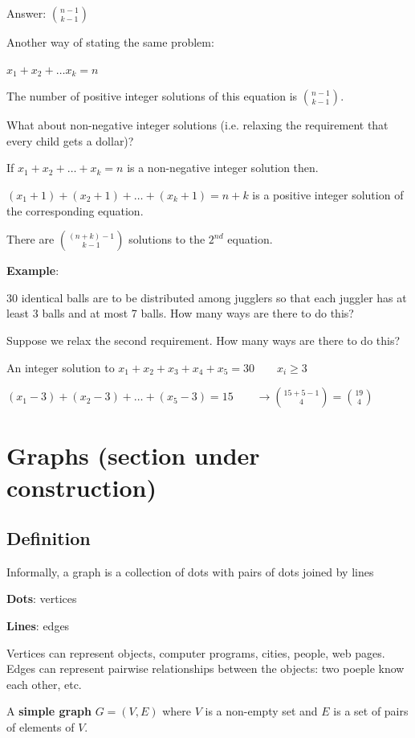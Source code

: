 \documentclass[9pt, letterpaper, oneside]{article}
\begin{document}
Answer: $\displaystyle {n - 1 \choose k - 1}$

Another way of stating the same problem:

$x_1 + x_2 + \ldots x_k = n$

The number of positive integer solutions of this equation is ${n - 1 \choose k - 1}$.

What about non-negative integer solutions (i.e. relaxing the requirement that every child gets a dollar)?

If $x_1 + x_2 + \ldots + x_k = n$ is a non-negative integer solution then.

$(x_1 + 1) + (x_2 + 1) + \ldots + (x_k + 1) = n + k$ is a positive integer solution of the corresponding equation.

There are ${(n + k) - 1 \choose k - 1}$ solutions to the $2^{nd}$ equation.

\textbf{Example}: 

30 identical balls are to be distributed among jugglers so that each juggler has at least 3 balls and at most 7 balls. How many ways are there to do this?

Suppose we relax the second requirement. How many ways are there to do this?

An integer solution to $x_1 + x_2 + x_3 + x_4 + x_5 = 30 \qquad x_i \geq 3$

$\displaystyle (x_1 - 3) + (x_2 - 3) + \ldots + (x_5 - 3) = 15 \qquad \to {15 + 5 - 1 \choose 4} = {19 \choose 4}$

\section{Graphs (section under construction)}

\subsection{Definition}

Informally, a graph is a collection of dots with pairs of dots joined by lines

\textbf{Dots}: vertices

\textbf{Lines}: edges

Vertices can represent objects, computer programs, cities, people, web pages.
Edges can represent pairwise relationships between the objects: two poeple know each other,  etc.

A \textbf{simple graph} $G = (V, E)$ where $V$ is a non-empty set and $E$ is a set of pairs of elements of $V$.
\end{document}
